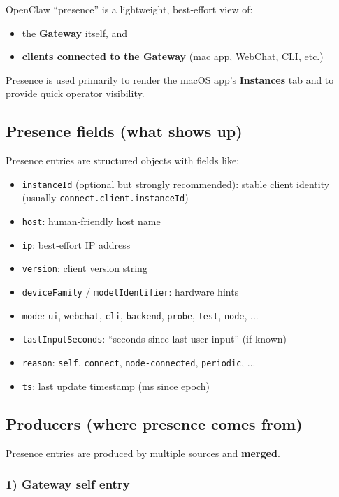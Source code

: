 OpenClaw “presence” is a lightweight, best‑effort view of:

\begin{itemize}
  \item the \textbf{Gateway} itself, and
  \item \textbf{clients connected to the Gateway} (mac app, WebChat, CLI, etc.)
\end{itemize}


Presence is used primarily to render the macOS app’s \textbf{Instances} tab and to
provide quick operator visibility.

\subsection{Presence fields (what shows up)}


Presence entries are structured objects with fields like:

\begin{itemize}
  \item \texttt{instanceId} (optional but strongly recommended): stable client identity (usually \texttt{connect.client.instanceId})
  \item \texttt{host}: human‑friendly host name
  \item \texttt{ip}: best‑effort IP address
  \item \texttt{version}: client version string
  \item \texttt{deviceFamily} / \texttt{modelIdentifier}: hardware hints
  \item \texttt{mode}: \texttt{ui}, \texttt{webchat}, \texttt{cli}, \texttt{backend}, \texttt{probe}, \texttt{test}, \texttt{node}, ...
  \item \texttt{lastInputSeconds}: “seconds since last user input” (if known)
  \item \texttt{reason}: \texttt{self}, \texttt{connect}, \texttt{node-connected}, \texttt{periodic}, ...
  \item \texttt{ts}: last update timestamp (ms since epoch)
\end{itemize}


\subsection{Producers (where presence comes from)}


Presence entries are produced by multiple sources and \textbf{merged}.

\subsubsection{1) Gateway self entry}



